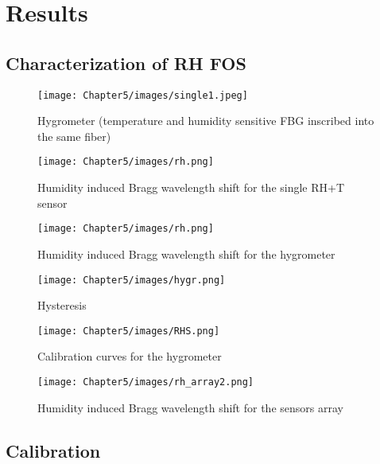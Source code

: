 \newpage


\section{Results}


\subsection{Characterization of RH FOS}

\begin{figure}[!h]
\centering
\texttt{[image: Chapter5/images/single1.jpeg]}
\caption{Hygrometer (temperature and humidity sensitive FBG inscribed into the same fiber)}
\label{fig_single_photo}
\end{figure}

\begin{figure}[!h]
\centering
\texttt{[image: Chapter5/images/rh.png]}
\caption{Humidity induced Bragg wavelength shift for the single RH+T sensor}
\label{fig_single_wavelength}
\end{figure}


\begin{figure}[!h]
\centering
\texttt{[image: Chapter5/images/rh.png]}
\caption{Humidity induced Bragg wavelength shift for the hygrometer}
\label{fig_single_wavelength}
\end{figure}


\begin{figure}[!h]
\centering
\texttt{[image: Chapter5/images/hygr.png]}
\caption{Hysteresis}
\label{fig_hygrometer1}
\end{figure}


\begin{figure}[!h]
\centering
\texttt{[image: Chapter5/images/RHS.png]}
\caption{Calibration curves for the hygrometer}
\label{fig_single_calibration}
\end{figure}


\begin{figure}[!h]
\centering
\texttt{[image: Chapter5/images/rh\_array2.png]}
\caption{Humidity induced Bragg wavelength shift for the sensors array}
\label{fig_single_calibration}
\end{figure}

\subsection{Calibration}

